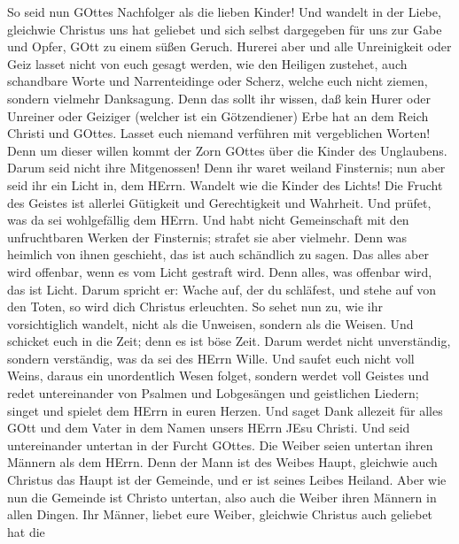  So seid nun GOttes Nachfolger als die lieben Kinder!
 Und wandelt in der Liebe, gleichwie Christus uns hat
geliebet und sich selbst dargegeben für uns zur Gabe und Opfer, GOtt zu
einem süßen Geruch.  Hurerei aber und alle Unreinigkeit oder
Geiz lasset nicht von euch gesagt werden, wie den Heiligen zustehet,
 auch schandbare Worte und Narrenteidinge oder Scherz,
welche euch nicht ziemen, sondern vielmehr Danksagung.  Denn
das sollt ihr wissen, daß kein Hurer oder Unreiner oder Geiziger
(welcher ist ein Götzendiener) Erbe hat an dem Reich Christi und GOttes.
 Lasset euch niemand verführen mit vergeblichen Worten! Denn
um dieser willen kommt der Zorn GOttes über die Kinder des Unglaubens.
 Darum seid nicht ihre Mitgenossen!  Denn ihr
waret weiland Finsternis; nun aber seid ihr ein Licht in, dem HErrn.
 Wandelt wie die Kinder des Lichts! Die Frucht des Geistes
ist allerlei Gütigkeit und Gerechtigkeit und Wahrheit.  Und
prüfet, was da sei wohlgefällig dem HErrn.  Und habt nicht
Gemeinschaft mit den unfruchtbaren Werken der Finsternis; strafet sie
aber vielmehr.  Denn was heimlich von ihnen geschieht, das
ist auch schändlich zu sagen.  Das alles aber wird
offenbar, wenn es vom Licht gestraft wird. Denn alles, was offenbar
wird, das ist Licht.  Darum spricht er: Wache auf, der du
schläfest, und stehe auf von den Toten, so wird dich Christus
erleuchten.  So sehet nun zu, wie ihr vorsichtiglich
wandelt, nicht als die Unweisen, sondern als die Weisen. 
Und schicket euch in die Zeit; denn es ist böse Zeit. 
Darum werdet nicht unverständig, sondern verständig, was da sei des
HErrn Wille.  Und saufet euch nicht voll Weins, daraus ein
unordentlich Wesen folget, sondern werdet voll Geistes  und
redet untereinander von Psalmen und Lobgesängen und geistlichen Liedern;
singet und spielet dem HErrn in euren Herzen.  Und saget
Dank allezeit für alles GOtt und dem Vater in dem Namen unsers HErrn
JEsu Christi.  Und seid untereinander untertan in der
Furcht GOttes.  Die Weiber seien untertan ihren Männern als
dem HErrn.  Denn der Mann ist des Weibes Haupt, gleichwie
auch Christus das Haupt ist der Gemeinde, und er ist seines Leibes
Heiland.  Aber wie nun die Gemeinde ist Christo untertan,
also auch die Weiber ihren Männern in allen Dingen.  Ihr
Männer, liebet eure Weiber, gleichwie Christus auch geliebet hat die
